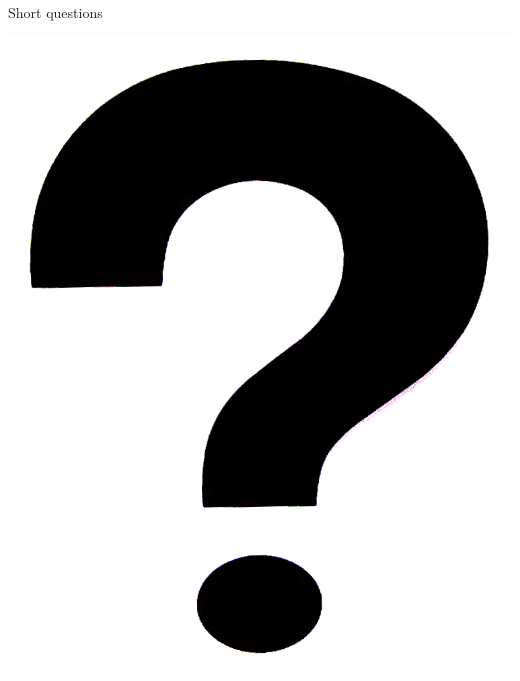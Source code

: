 \documentclass[../main.tex]{subfiles}
\begin{document}
\begin{frame}[fragile]{Short questions}

\centering
\includegraphics[scale=0.1]{pics/Question_Mark.png}

\end{frame}
\end{document}
